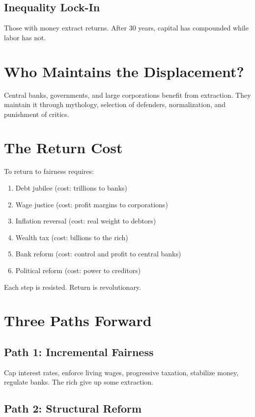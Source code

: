 \documentclass[12pt]{article}
\begin{document}
\subsection{Inequality Lock-In}

Those with money extract returns. After 30 years, capital has compounded while labor has not.

\section{Who Maintains the Displacement?}

Central banks, governments, and large corporations benefit from extraction. They maintain it through mythology, selection of defenders, normalization, and punishment of critics.

\section{The Return Cost}

To return to fairness requires:
\begin{enumerate}
\item Debt jubilee (cost: trillions to banks)
\item Wage justice (cost: profit margins to corporations)
\item Inflation reversal (cost: real weight to debtors)
\item Wealth tax (cost: billions to the rich)
\item Bank reform (cost: control and profit to central banks)
\item Political reform (cost: power to creditors)
\end{enumerate}

Each step is resisted. Return is revolutionary.

\section{Three Paths Forward}

\subsection{Path 1: Incremental Fairness}

Cap interest rates, enforce living wages, progressive taxation, stabilize money, regulate banks. The rich give up some extraction.

\subsection{Path 2: Structural Reform}
\end{document}
